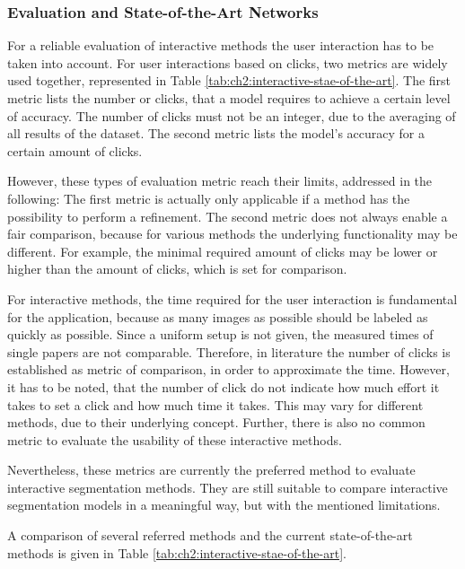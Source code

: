 \subsubsection{Evaluation and State-of-the-Art Networks} \label{ch2:sec3:eval_interactive_methods}
For a reliable evaluation of interactive methods the user interaction has to be taken into account.
For user interactions based on clicks, two metrics are widely used together, represented in Table \ref{tab:ch2:interactive-stae-of-the-art}. 
The first metric lists the number or clicks, that a model requires to achieve a certain level of accuracy. 
The number of clicks must not be an integer, due to the averaging of all results of the dataset.
The second metric lists the model's accuracy for a certain amount of clicks.

However, these types of evaluation metric reach their limits, addressed in the following:
The first metric is actually only applicable if a method has the possibility to perform a refinement.
The second metric does not always enable a fair comparison, because for various methods the underlying functionality may be different. 
For example, the minimal required amount of clicks may be lower or higher than the amount of clicks, which is set for comparison.

For interactive methods, the time required for the user interaction is fundamental for the application, because as many images as possible should be labeled as quickly as possible.
Since a uniform setup is not given, the measured times of single papers are not comparable.
Therefore, in literature the number of clicks is established as metric of comparison, in order to approximate the time.
However, it has to be noted, that the number of click do not indicate how much effort it takes to set a click and how much time it takes.
This may vary for different methods, due to their underlying concept.
Further, there is also no common metric to evaluate the usability of these interactive methods.

Nevertheless, these metrics are currently the preferred method to evaluate interactive segmentation methods.
They are still suitable to compare interactive segmentation models in a meaningful way, but with the mentioned limitations.

A comparison of several referred methods and the current state-of-the-art methods is given in Table \ref{tab:ch2:interactive-stae-of-the-art}.


